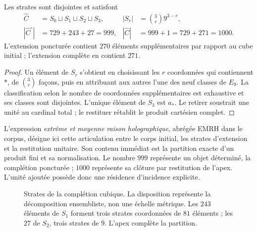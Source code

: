 \begin{proposition}
Les strates sont disjointes et satisfont
\begin{align}
 \widehat C&=S_0\sqcup S_1\sqcup S_2\sqcup S_3,
 &|S_r|&=\binom3r9^{3-r},\label{vi:cubo:estratos}\\
 |\widehat C^{\circ}|&=729+243+27=999,
 &|\widehat C|&=999+1=729+271=1000.\label{vi:cubo:999}
\end{align}
L'extension poncturée contient \(270\) éléments supplémentaires par rapport au cube
initial ; l'extension complète en contient \(271\).
\end{proposition}
\begin{proof}
Un élément de \(S_r\) s'obtient en choisissant les \(r\) coordonnées qui
contiennent \(\ast\), de \(\binom3r\) façons, puis en attribuant aux autres
l'une des neuf classes de \(E_9\). La classification selon le nombre de
coordonnées supplémentaires est exhaustive et ses classes sont disjointes. L'unique
élément de \(S_3\) est \(a_\ast\). Le retirer soustrait une unité au cardinal
total ; le restituer rétablit le produit cartésien complet.
\end{proof}

L'expression \emph{extrême et moyenne raison holographique}, abrégée EMRH dans
le corpus, désigne ici cette articulation entre le corps initial, les
strates d'extension et la restitution unitaire. Son contenu immédiat
est la partition exacte d'un produit fini et sa normalisation. Le nombre
\(999\) représente un objet déterminé, la complétion poncturée ;
\(1000\) représente sa clôture par restitution de l'apex. L'unité
ajoutée possède donc une résidence d'incidence explicite.

\begin{figure}[htbp]
\centering
{}
\caption{Strates de la complétion cubique. La disposition représente
la décomposition ensembliste, non une échelle métrique. Les \(243\) éléments
de \(S_1\) forment trois strates coordonnées de \(81\) éléments ; les \(27\)
de \(S_2\), trois strates de \(9\). L'apex complète la partition.}
\label{vi:cubo:estratos-fig}
\end{figure}

